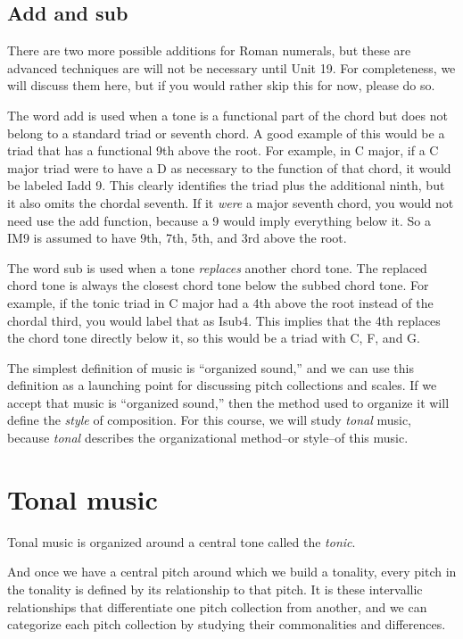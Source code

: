 \documentclass{book}
\begin{document}
\hypertarget{add-and-sub}{%
\subsection{Add and sub}\label{add-and-sub}}

There are two more possible additions for Roman numerals, but these are
advanced techniques are will not be necessary until Unit 19. For completeness,
we will discuss them here, but if you would rather skip this for now, please
do so.

The word add is used when a tone is a functional part of the chord but does
not belong to a standard triad or seventh chord. A good example of this would
be a triad that has a functional 9th above the root. For example, in C major,
if a C major triad were to have a D as necessary to the function of that
chord, it would be labeled Iadd 9. This clearly identifies the triad plus the
additional ninth, but it also omits the chordal seventh. If it \emph{were} a
major seventh chord, you would not need use the add function, because a 9
would imply everything below it. So a IM9 is assumed to have 9th, 7th, 5th,
and 3rd above the root.

The word sub is used when a tone \emph{replaces} another chord tone. The
replaced chord tone is always the closest chord tone below the subbed chord
tone. For example, if the tonic triad in C major had a 4th above the root
instead of the chordal third, you would label that as Isub4. This implies that
the 4th replaces the chord tone directly below it, so this would be a triad
with C, F, and G.

The simplest definition of music is ``organized sound,'' and we can use this
definition as a launching point for discussing pitch collections and scales.
If we accept that music is ``organized sound,'' then the method used to
organize it will define the \emph{style} of composition. For this course, we
will study \emph{tonal} music, because \emph{tonal} describes the
organizational method--or style--of this music.

\hypertarget{tonal-music}{%
\section{Tonal music}\label{tonal-music}}

Tonal music is organized around a central tone called the \emph{tonic}.

And once we have a central pitch around which we build a tonality, every pitch
in the tonality is defined by its relationship to that pitch. It is these
intervallic relationships that differentiate one pitch collection from
another, and we can categorize each pitch collection by studying their
commonalities and differences.
\end{document}
